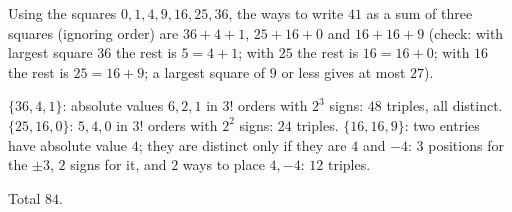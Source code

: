 Using the squares $0,1,4,9,16,25,36$, the ways to write $41$ as a sum of three squares (ignoring order) are $36+4+1$, $25+16+0$ and $16+16+9$ (check: with largest square $36$ the rest is $5=4+1$; with $25$ the rest is $16=16+0$; with $16$ the rest is $25=16+9$; a largest square of $9$ or less gives at most $27$).

\emph{$\{36,4,1\}$}: absolute values $6,2,1$ in $3!$ orders with $2^3$ signs: $48$ triples, all distinct.
\emph{$\{25,16,0\}$}: $5,4,0$ in $3!$ orders with $2^2$ signs: $24$ triples.
\emph{$\{16,16,9\}$}: two entries have absolute value $4$; they are distinct only if they are $4$ and $-4$: $3$ positions for the $\pm3$, $2$ signs for it, and $2$ ways to place $4,-4$: $12$ triples.

Total $\boxed{84}$.
